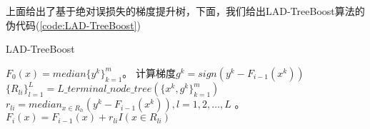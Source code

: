               \par
              上面给出了基于绝对误损失的梯度提升树，下面，我们给出LAD-TreeBoost算法的伪代码(\ref{code:LAD-TreeBoost})
              \begin{algorithm}[H]
                  \caption{LAD-TreeBoost}\label{code:LAD-TreeBoost}
                  \begin{algorithmic}[1]
                      \State $F_0(x) = median\{y^k\}_{k=1}^m$。
                          \State 计算梯度$g^k = sign(y^k - F_{i-1}(x^k))$
                          \State $\{R_{li}\}_{l=1}^L = L\_terminal\_node\_tree(\{x^k,g^k\}_{k=1}^m)$
                          \State $r_{li} = median_{x\in R_{li}}(y^k - F_{i-1}(x^k)),l = 1,2,\dots,L$ 。
                          \State $F_i(x) = F_{i-1}(x) + r_{li}I(x\in R_{li})$
                      \EndFor
                  \end{algorithmic}
              \end{algorithm}
